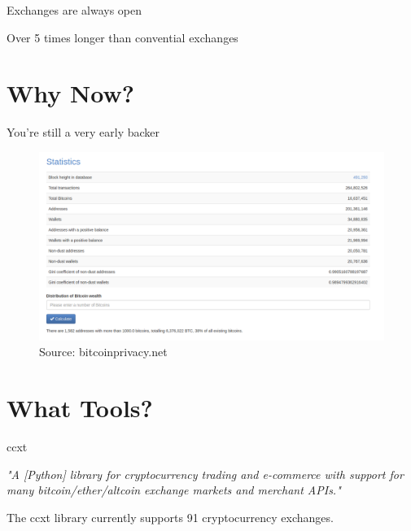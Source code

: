 \documentclass{beamer}
\begin{document}
\begin{frame}{Exchanges are \alert{always} open}
  \begin{center}
    Over 5 times longer than convential exchanges \cite{ExchOpen}
  \end{center}
\end{frame}



\section{Why Now?}

\begin{frame}{You're still a \alert{very} early backer}
\pause
  \begin{figure}
    \begin{center}
      \includegraphics[scale=0.21]{images/statistics}
      \caption{Source: bitcoinprivacy.net \cite{NumAdd}}
    \end{center}
  \end{figure}
\end{frame}



\section{What Tools?}

\begin{frame}{ccxt}
  \begin{center}
    \emph{"A [Python] library for cryptocurrency trading and e-commerce with support for many bitcoin/ether/altcoin exchange markets and merchant APIs."}

    The ccxt library currently supports 91 cryptocurrency exchanges. \cite{ccxt}
  \end{center}
\end{frame}
\end{document}
